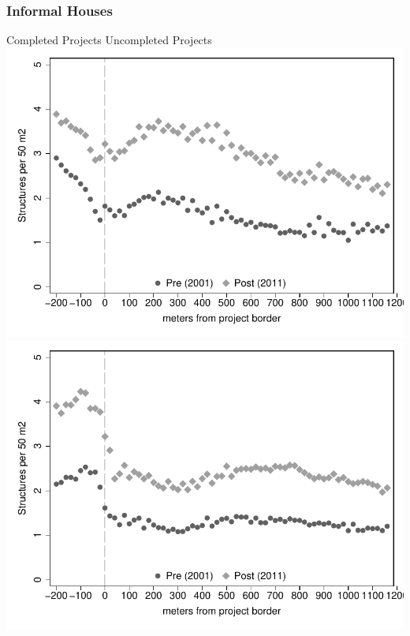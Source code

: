 \documentclass[aspectratio=149]{beamer}
\begin{document}
\begin{frame}
\frametitle{Informal Houses}
\hspace{10mm} Completed Projects \hspace{30mm} Uncompleted Projects
\hspace*{-10mm}
\includegraphics[scale=.48]{bblu_inf_c.pdf}
\includegraphics[scale=.48]{bblu_inf_p.pdf}
\end{frame}
\end{document}
